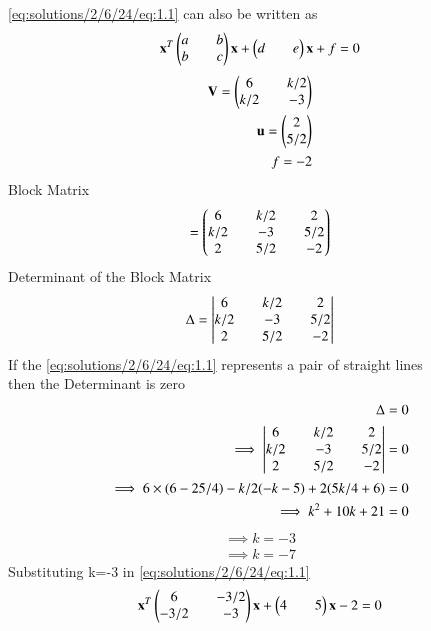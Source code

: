 \eqref{eq:solutions/2/6/24/eq:1.1} can also be written as 
\begin{equation}\label{eq:solutions/2/6/24/eq:2.1}
\mathbf{x}^T \begin{pmatrix}a && b \\ b && c\end{pmatrix} \mathbf{x} + \begin{pmatrix}d && e\end{pmatrix}\mathbf{x} + f = 0
\end{equation}
\begin{equation}\label{eq:solutions/2/6/24/eq:2.2}
\begin{split}
\mathbf{V}=\begin{pmatrix}6 && k/2\\ k/2 && -3\end{pmatrix}\\
\mathbf{u}=\begin{pmatrix}2\\5/2\end{pmatrix}\\
f= -2
\end{split}
\end{equation}
Block Matrix
\begin{equation} \label{eq:solutions/2/6/24/eq:2.3}
 = \begin{pmatrix}6 && k/2 && 2\\ k/2 && -3 && 5/2\\2 && 5/2 && -2\end{pmatrix}
\end{equation} 
Determinant of the Block Matrix
\begin{equation} \label{eq:solutions/2/6/24/eq:2.4}
\Delta = \begin{vmatrix}6 && k/2 && 2\\ k/2 && -3 && 5/2\\2 && 5/2 && -2\end{vmatrix}
\end{equation}
If the \eqref{eq:solutions/2/6/24/eq:1.1} represents a pair of straight lines\\
then the Determinant is zero
\begin{equation} \label{eq:solutions/2/6/24/eq:2.5}
\begin{split}
\Delta = 0\\
\implies \begin{vmatrix}6 && k/2 && 2\\ k/2 && -3 && 5/2\\2 && 5/2 && -2\end{vmatrix} = 0\\
\implies 6\times(6-25/4)-k/2(-k-5)+2(5k/4+6) = 0\\
\implies k^2 + 10k + 21 = 0
\end{split}
\end{equation}
\begin{equation} \label{eq:solutions/2/6/24/eq:2.6}
\begin{split} 
\implies \boxed{ k = -3 }\\
\implies \boxed{ k = -7 }
\end{split}
\end{equation}
Substituting k=-3 in \eqref{eq:solutions/2/6/24/eq:1.1}
\begin{equation} \label{eq:solutions/2/6/24/eq:2.7}
\mathbf{x}^T \begin{pmatrix}6 && -3/2 \\ -3/2 && -3\end{pmatrix} \mathbf{x} + \begin{pmatrix}4 && 5\end{pmatrix}\mathbf{x} -2 = 0
\end{equation}
